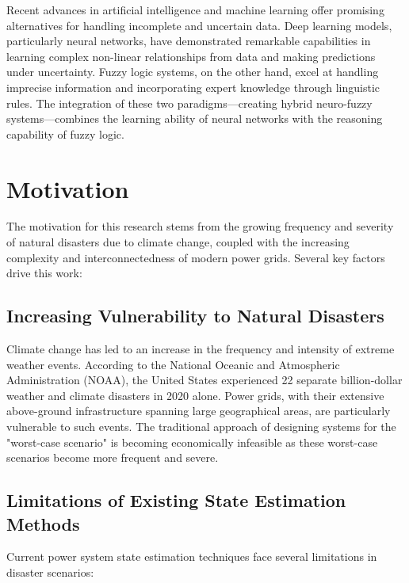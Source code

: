 \documentclass[12pt,a4paper]{report}
\begin{document}
Recent advances in artificial intelligence and machine learning offer promising alternatives for handling incomplete and uncertain data. Deep learning models, particularly neural networks, have demonstrated remarkable capabilities in learning complex non-linear relationships from data and making predictions under uncertainty. Fuzzy logic systems, on the other hand, excel at handling imprecise information and incorporating expert knowledge through linguistic rules. The integration of these two paradigms—creating hybrid neuro-fuzzy systems—combines the learning ability of neural networks with the reasoning capability of fuzzy logic.

\section{Motivation}

The motivation for this research stems from the growing frequency and severity of natural disasters due to climate change, coupled with the increasing complexity and interconnectedness of modern power grids. Several key factors drive this work:

\subsection{Increasing Vulnerability to Natural Disasters}

Climate change has led to an increase in the frequency and intensity of extreme weather events. According to the National Oceanic and Atmospheric Administration (NOAA), the United States experienced 22 separate billion-dollar weather and climate disasters in 2020 alone. Power grids, with their extensive above-ground infrastructure spanning large geographical areas, are particularly vulnerable to such events. The traditional approach of designing systems for the "worst-case scenario" is becoming economically infeasible as these worst-case scenarios become more frequent and severe.

\subsection{Limitations of Existing State Estimation Methods}

Current power system state estimation techniques face several limitations in disaster scenarios:
\end{document}
